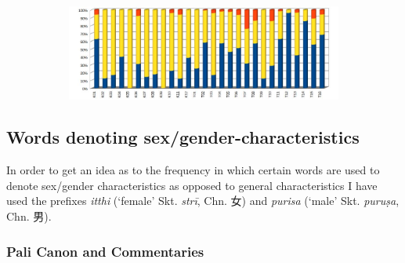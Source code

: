 \begin{figure}[!h]
  \begin{subfigure}{\linewidth}
  \begin{center}
    \includegraphics[width=0.9\linewidth]{tibetan_perc.jpg}
  \end{center}
  \end{subfigure}
\setcounter{figure}{9}
\label{tibetan2}
\end{figure}

\newpage
\subsection{Words denoting sex/gender-characteristics}
\label{appendix2b}

In order to get an idea as to the frequency in which certain words are used to denote sex/gender characteristics as opposed to general characteristics I have used the prefixes \textit{itthi} (`female' Skt. \textit{strī}, Chn. 女) and \textit{purisa} (`male' Skt. \textit{puruṣa}, Chn. 男). 

\subsubsection*{Pali Canon and Commentaries}

